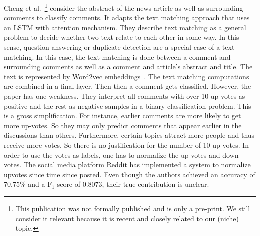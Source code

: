 Cheng et al.~\cite{2018arXiv180807191C}\footnote{This publication was not formally published and is only a pre-print. We still consider it relevant because it is recent and closely related to our (niche) topic.} consider the abstract of the news article as well as surrounding comments to classify comments. It adapts the text matching approach that uses an LSTM with attention mechanism. They describe text matching as a general problem to decide whether two text relate to each other in some way. In this sense, question answering or duplicate detection are a special case of a text matching. In this case, the text matching is done between a comment and surrounding comments as well as a comment and article's abstract and title. The text is represented by Word2vec embeddings~\cite{DBLP:journals/corr/abs-1301-3781}. The text matching computations are combined  in a final layer. Then then a comment gets classified. However, the paper has one weakness. They interpret all comments with over 10 up-votes as positive and the rest as negative samples in a binary classification problem. This is a gross simplification. For instance, earlier comments are more likely to get more up-votes. So they may only predict comments that appear earlier in the discussions than others. Furthermore, certain topics attract more people and thus receive more votes. So there is no justification for the number of 10 up-votes. In order to use the votes as labels, one has to normalize the up-votes and down-votes. The social media platform Reddit has implemented a system to normalize upvotes since time since posted. Even though the authors achieved an accuracy of $70.75\%$ and a $\text{F}_{1}$ score of $0.8073$, their true contribution is unclear.

\newpage

